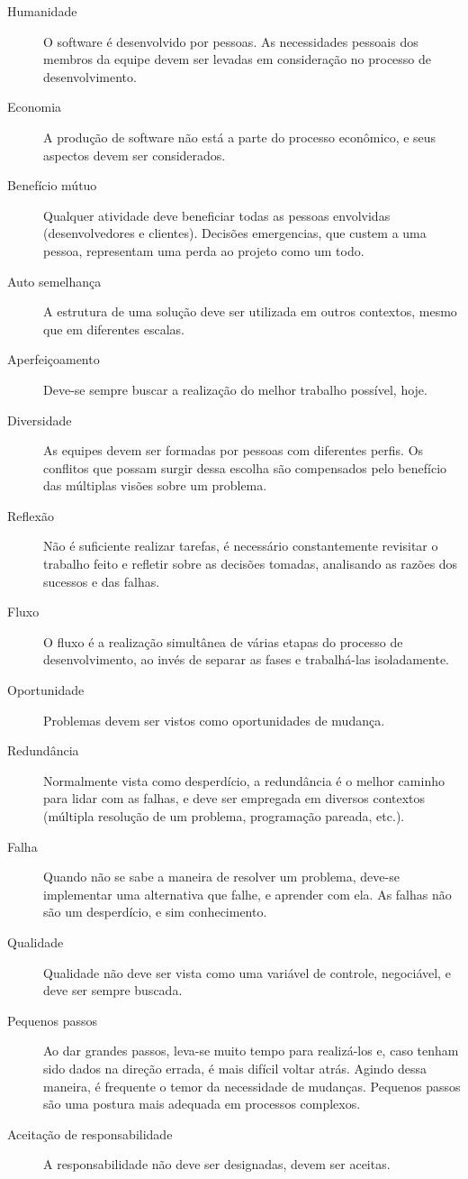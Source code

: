 \documentclass[a4paper,12pt,font=plain,header=plain]{abnt}
\begin{document}
      \begin{description}
        \item[Humanidade]
          O software é desenvolvido por pessoas. As necessidades pessoais dos membros da equipe devem ser levadas em consideração no processo de desenvolvimento.
        \item[Economia]
          A produção de software não está a parte do processo econômico, e seus aspectos devem ser considerados.
        \item[Benefício mútuo]
          Qualquer atividade deve beneficiar todas as pessoas envolvidas (desenvolvedores e clientes). Decisões emergencias, que custem a uma pessoa, representam uma perda ao projeto como um todo.
        \item[Auto semelhança]
          A estrutura de uma solução deve ser utilizada em outros contextos, mesmo que em diferentes escalas.
        \item[Aperfeiçoamento]
          Deve-se sempre buscar a realização do melhor trabalho possível, hoje.
        \item[Diversidade]
          As equipes devem ser formadas por pessoas com diferentes perfis. Os conflitos que possam surgir dessa escolha são compensados pelo benefício das múltiplas visões sobre um problema.
        \item[Reflexão]
          Não é suficiente realizar tarefas, é necessário constantemente revisitar o trabalho feito e refletir sobre as decisões tomadas, analisando as razões dos sucessos e das falhas.
        \item[Fluxo]
          O fluxo é a realização simultânea de várias etapas do processo de desenvolvimento, ao invés de separar as fases e trabalhá-las isoladamente.
        \item[Oportunidade]
          Problemas devem ser vistos como oportunidades de mudança.
        \item[Redundância]
          Normalmente vista como desperdício, a redundância é o melhor caminho para lidar com as falhas, e deve ser empregada em diversos contextos (múltipla resolução de um problema, programação pareada, etc.).
        \item[Falha]
          Quando não se sabe a maneira de resolver um problema, deve-se implementar uma alternativa que falhe, e aprender com ela. As falhas não são um desperdício, e sim conhecimento.
        \item[Qualidade]
          Qualidade não deve ser vista como uma variável de controle, negociável, e deve ser sempre buscada.
        \item[Pequenos passos]
          Ao dar grandes passos, leva-se muito tempo para realizá-los e, caso tenham sido dados na direção errada, é mais difícil voltar atrás. Agindo dessa maneira, é frequente o temor da necessidade de mudanças. Pequenos passos são uma postura mais adequada em processos complexos.
        \item[Aceitação de responsabilidade]
          A responsabilidade não deve ser designadas, devem ser aceitas.
      \end{description}
\end{document}
